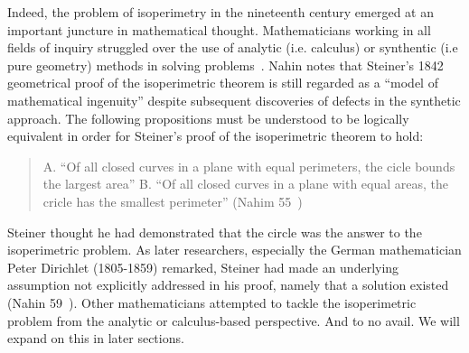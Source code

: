 \documentclass[a4paper]{book}
\numberwithin{theorem}{section}%
\begin{document}
Indeed, the problem of isoperimetry in the nineteenth century emerged at an important juncture in mathematical thought. Mathematicians working in all fields of inquiry struggled over the use of analytic (i.e. calculus) or synthentic (i.e pure geometry) methods in solving problems~\citep{wiegert2010sagacity}. Nahin notes that Steiner's 1842 geometrical proof of the isoperimetric theorem is still regarded as a ``model of mathematical ingenuity'' despite subsequent discoveries of defects in the synthetic approach. The following propositions must be understood to be logically equivalent in order for Steiner's proof of the isoperimetric theorem to hold:
\begin{center}
    \begin{quote}
        A. ``Of all closed curves in a plane with equal perimeters, the cicle bounds the largest area''
        \newline
        [and]
        \newline
        B. ``Of all closed curves in a plane with equal areas, the cricle has the smallest perimeter'' (Nahim 55~\citep{nahin2021least})
    \end{quote}
\end{center}

Steiner thought he had demonstrated that the circle was the answer to the isoperimetric problem. As later researchers, especially the German mathematician Peter Dirichlet (1805-1859) remarked, Steiner had made an underlying assumption not explicitly addressed in his proof, namely that a solution existed (Nahin 59~\citep{nahin2021least}).
\newline
\newline
Other mathematicians attempted to tackle the isoperimetric problem from the analytic or calculus-based perspective. And to no avail. We will expand on this in later sections.
\end{document}
